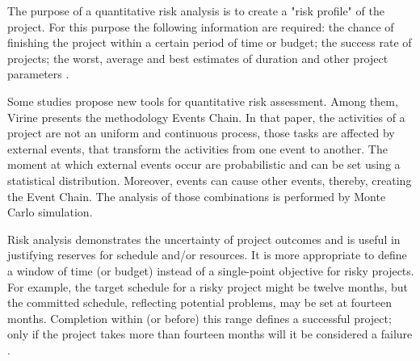 The purpose of a quantitative risk analysis is to create a "risk profile" of the project. For this purpose the following information are required: the chance of finishing the project within a certain period of time or budget; the success rate of projects; the worst, average and best estimates of duration and other project parameters \cite{PMBOK2008}.

Some studies propose new tools for quantitative risk assessment. Among them, Virine \cite{VIRINE2009} presents the methodology Events Chain. In that paper, the activities of a project are not an uniform and continuous process, those tasks are affected by external events, that transform the activities from one event to another. The moment at which external events occur are probabilistic and can be set using a statistical distribution. Moreover, events can cause other events, thereby, creating the Event Chain. The analysis of those combinations is performed by Monte Carlo simulation.

Risk analysis demonstrates the uncertainty of project outcomes and is useful in justifying reserves for schedule and/or resources. It is more appropriate to define a window of time (or budget) instead of a single-point objective for risky projects. For example, the target schedule for a risky project might be twelve months, but the committed schedule, reflecting potential problems, may be set at fourteen months. Completion within (or before) this range defines a successful project; only if the project takes more than fourteen months will it be considered a failure \cite{kendrick2003identifying}.

